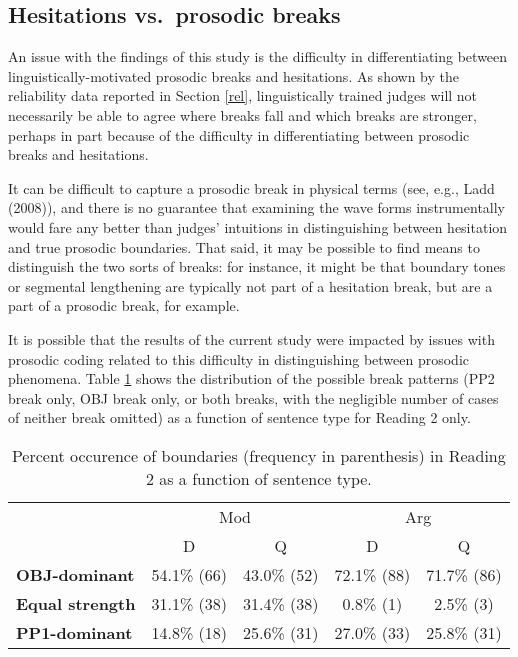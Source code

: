 \documentclass[11pt,oneside]{book}
\begin{document}
\hypertarget{hesi}{%
\subsection{Hesitations vs.~prosodic breaks}\label{hesi}}

An issue with the findings of this study is the difficulty in differentiating between linguistically-motivated prosodic breaks and hesitations. As shown by the reliability data reported in Section \ref{rel}, linguistically trained judges will not necessarily be able to agree where breaks fall and which breaks are stronger, perhaps in part because of the difficulty in differentiating between prosodic breaks and hesitations.

It can be difficult to capture a prosodic break in physical terms (see, e.g., Ladd (2008)), and there is no guarantee that examining the wave forms instrumentally would fare any better than judges' intuitions in distinguishing between hesitation and true prosodic boundaries. That said, it may be possible to find means to distinguish the two sorts of breaks: for instance, it might be that boundary tones or segmental lengthening are typically not part of a hesitation break, but are a part of a prosodic break, for example.

It is possible that the results of the current study were impacted by issues with prosodic coding related to this difficulty in distinguishing between prosodic phenomena. Table \ref{tab:combobr} shows the distribution of the possible break patterns (PP2 break only, OBJ break only, or both breaks, with the negligible number of cases of neither break omitted) as a function of sentence type for Reading 2 only.

\begin{table}[!h]

\caption{\label{tab:combobr}Percent occurence of boundaries (frequency in parenthesis) in Reading 2 as a function of sentence type.}
\centering
\begin{tabular}{>{\bfseries}lcccc}
\toprule
\multicolumn{1}{c}{ } & \multicolumn{2}{c}{Mod} & \multicolumn{2}{c}{Arg} \\
\cmidrule(l{3pt}r{3pt}){2-3} \cmidrule(l{3pt}r{3pt}){4-5}
  & D & Q & D & Q\\
\midrule
OBJ-dominant & 54.1\% (66) & 43.0\% (52) & 72.1\% (88) & 71.7\% (86)\\
Equal strength & 31.1\% (38) & 31.4\% (38) & 0.8\% (1) & 2.5\% (3)\\
PP1-dominant & 14.8\% (18) & 25.6\% (31) & 27.0\% (33) & 25.8\% (31)\\
\bottomrule
\end{tabular}
\end{table}
\end{document}
